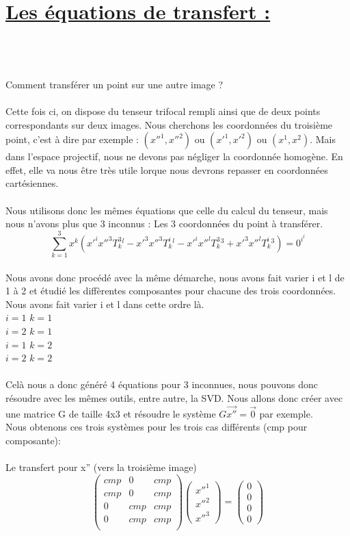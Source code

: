 \documentclass[a4paper,11pt,fleqn]{report}
\begin{document}
\section{\underline{Les \'equations de transfert :}}
\\\\\\
	Comment transf\'erer un point sur une autre image ?\\\\
	Cette fois ci, on dispose du tenseur trifocal rempli ainsi que de deux points correspondants sur deux images.
	Nous cherchons les coordonn\'ees du troisi\`eme point, c'est \`a dire par exemple : $(x''^1,x''^2)$ ou $(x'^1,x'^2)$ ou $(x^1,x^2)$. Mais dans  l'espace projectif, nous ne devons pas n\'egliger la coordonn\'ee homog\`ene. En effet, elle va nous \^etre tr\`es utile lorque nous devrons repasser en coordonn\'ees cart\'esiennes.
	\\
	\\
	Nous utilisons donc les m\^emes \'equations que celle du calcul du tenseur, mais nous n'avons plus que 3 inconnus : Les 3 coordonn\'ees du point \`a transf\'erer.
	$$\sum \limits_{k=1}^3 x^k(x'^ix''^3T_k^3^l - x'^3x''^3T_k^i^l - x'^ix''^lT_k^3^3 + x'^3x''^lT_k^i^3) = 0^i^l$$
	\\
	Nous avons donc proc\'ed\'e avec la m\^eme d\'emarche, nous avons fait varier i et l de 1 \`a 2 et \'etudi\'e les diff\`erentes composantes pour chacune des trois coordonn\'ees. Nous avons fait varier i et l dans cette ordre l\`a.
	\\$i=1$ $k=1$
	\\$i=2$ $k=1$
	\\$i=1$ $k=2$
	\\$i=2$ $k=2$\\\\Cel\`a nous a donc g\'en\'er\'e 4 \'equations pour 3 inconnues, nous pouvons donc r\'esoudre avec les m\^emes outils, entre autre, la SVD. Nous allons donc cr\'eer avec une matrice G de taille 4x3 et r\'esoudre le syst\`eme $G\vec{x''} = \vec{0}$ par exemple.\\Nous obtenons ces trois syst\`emes pour les trois cas diff\'erents (cmp pour composante):\\\\
	Le transfert pour x'' (vers la troisi\`eme image)\\
	$$ \begin{pmatrix}
	cmp&0&cmp \\
	cmp&0&cmp \\
	0&cmp&cmp \\
	0&cmp&cmp \\
	\end{pmatrix}\begin{pmatrix}x''^1\\x''^2\\x''^3\end{pmatrix} = \begin{pmatrix}0\\0\\0\\0\end{pmatrix} $$
\end{document}
